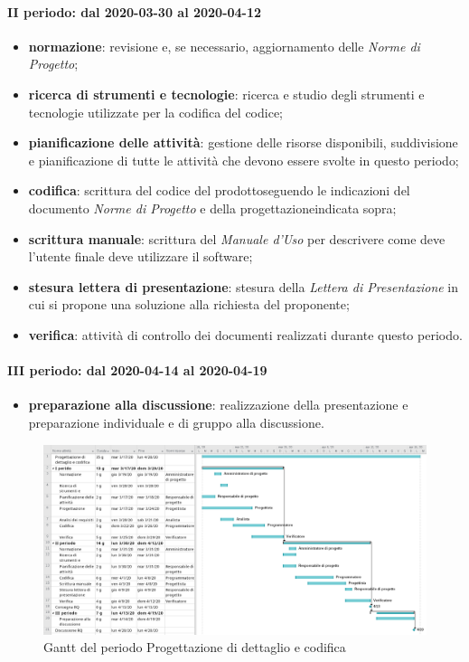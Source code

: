 \paragraph*{II periodo: dal 2020-03-30 al 2020-04-12}
\begin{itemize}
	\item \textbf{normazione}: revisione e, se necessario, aggiornamento delle \textit{Norme di Progetto};
	\item \textbf{ricerca di strumenti e tecnologie}: ricerca e studio degli strumenti e tecnologie utilizzate per la codifica del codice;
	\item \textbf{pianificazione delle attività}: gestione delle risorse disponibili, suddivisione e pianificazione di tutte le attività che devono essere svolte in questo periodo;
	\item \textbf{codifica}: scrittura del codice del prodotto\glosp seguendo le indicazioni del documento \textit{Norme di Progetto} e della progettazione\glosp indicata sopra;
	\item \textbf{scrittura manuale}: scrittura del \textit{Manuale d'Uso} per descrivere come deve l'utente finale deve utilizzare il software;
	\item \textbf{stesura lettera di presentazione}: stesura della \textit{Lettera di Presentazione} in cui si propone una soluzione alla richiesta del proponente;
	\item \textbf{verifica}: attività di controllo dei documenti realizzati durante questo periodo.
\end{itemize}

\paragraph*{III periodo: dal 2020-04-14 al 2020-04-19}
\begin{itemize}
	\item \textbf{preparazione alla discussione}: realizzazione della presentazione e preparazione individuale e di gruppo alla discussione.
\end{itemize}

\begin{landscape}
	\begin{figure}[H] 	
		\includegraphics[width=\linewidth]{./gantt/Progettazione di dettaglio e codifica.png}	
		\caption{Gantt del periodo Progettazione di dettaglio e codifica}	
	\end{figure}
\end{landscape}

